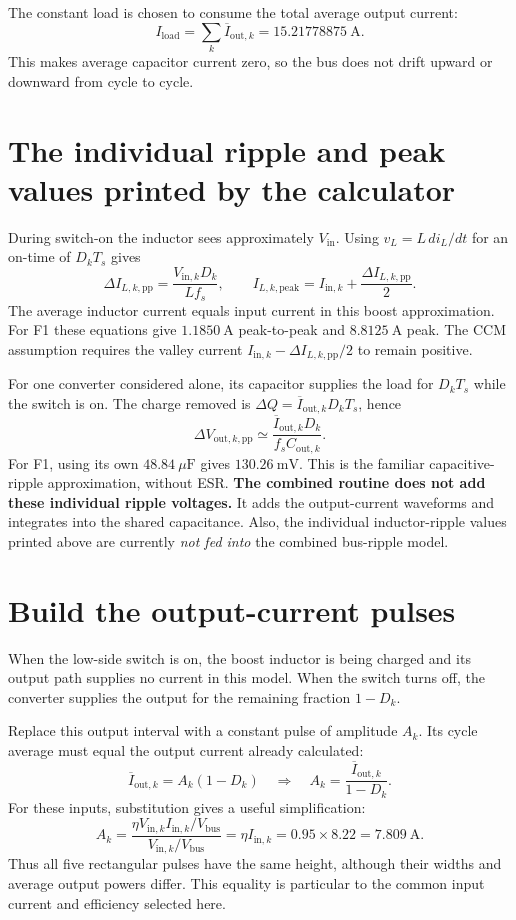 \documentclass[11pt,a4paper]{article}
\begin{document}
The constant load is chosen to consume the total average output current:
\[
 \boxed{I_{\mathrm{load}}=\sum_k\overline I_{\mathrm{out},k}
                         =15.21778875\ \mathrm{A}}.
\]
This makes average capacitor current zero, so the bus does not drift upward or
downward from cycle to cycle.

\section{The individual ripple and peak values printed by the calculator}

During switch-on the inductor sees approximately $V_{\mathrm{in}}$.
Using $v_L=L\,di_L/dt$ for an on-time of $D_kT_s$ gives
\[
 \boxed{\Delta I_{L,k,\mathrm{pp}}
       =\frac{V_{\mathrm{in},k}D_k}{L f_s}},\qquad
 \boxed{I_{L,k,\mathrm{peak}}
       =I_{\mathrm{in},k}+\frac{\Delta I_{L,k,\mathrm{pp}}}{2}}.
\]
The average inductor current equals input current in this boost approximation.
For F1 these equations give $1.1850\ \mathrm{A}$ peak-to-peak and
$8.8125\ \mathrm{A}$ peak. The CCM assumption requires the valley current
$I_{\mathrm{in},k}-\Delta I_{L,k,\mathrm{pp}}/2$ to remain positive.

For one converter considered alone, its capacitor supplies the load for
$D_kT_s$ while the switch is on. The charge removed is
$\Delta Q=\overline I_{\mathrm{out},k}D_kT_s$, hence
\[
 \boxed{\Delta V_{\mathrm{out},k,\mathrm{pp}}
       \simeq\frac{\overline I_{\mathrm{out},k}D_k}{f_s C_{\mathrm{out},k}}}.
\]
For F1, using its own $48.84\ \mu\mathrm{F}$ gives $130.26\ \mathrm{mV}$.
This is the familiar capacitive-ripple approximation, without ESR.
\textbf{The combined routine does not add these individual ripple voltages.}
It adds the output-current waveforms and integrates into the shared capacitance.
Also, the individual inductor-ripple values printed above are currently
\emph{not fed into} the combined bus-ripple model.

\section{Build the output-current pulses}

When the low-side switch is on, the boost inductor is being charged and its
output path supplies no current in this model. When the switch turns off,
the converter supplies the output for the remaining fraction $1-D_k$.

Replace this output interval with a constant pulse of amplitude $A_k$.
Its cycle average must equal the output current already calculated:
\[
 \overline I_{\mathrm{out},k}=A_k(1-D_k)
 \quad\Longrightarrow\quad
 \boxed{A_k=\frac{\overline I_{\mathrm{out},k}}{1-D_k}}.
\]
For these inputs, substitution gives a useful simplification:
\[
 A_k=\frac{\eta V_{\mathrm{in},k}I_{\mathrm{in},k}/V_{\mathrm{bus}}}
               {V_{\mathrm{in},k}/V_{\mathrm{bus}}}
     =\eta I_{\mathrm{in},k}=0.95\times8.22=7.809\ \mathrm{A}.
\]
Thus all five rectangular pulses have the same height, although their widths
and average output powers differ. This equality is particular to the common
input current and efficiency selected here.
\end{document}
